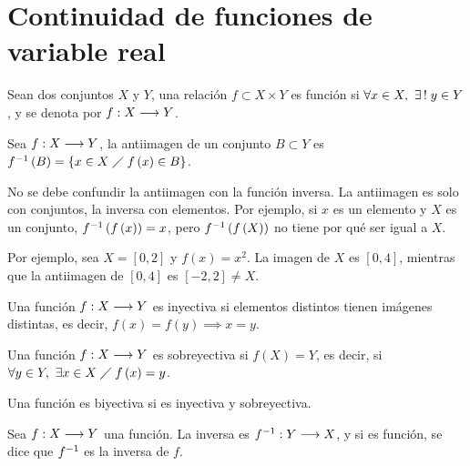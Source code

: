 \chapter{Continuidad de funciones de variable real}

\begin{defi}[Función]
    Sean dos conjuntos $X$ y $Y$, una relación $f\subset X\times Y$ es función si $\forall x\in X,\ \exists\, !\;
    y\in Y$, y se denota por $f : X\longrightarrow Y$.
\end{defi}

\begin{defi}[Antiimagen]
    Sea $f : X\longrightarrow Y$, la antiimagen de un conjunto $B\subset Y$ es $f ^{-1}\left( B \right) = \{
    x\in X\;\diagup\; f\left( x \right) \in B\} $.
\end{defi}

\begin{remark}
    No se debe confundir la antiimagen con la función inversa. La antiimagen es solo con conjuntos, la
    inversa con elementos. Por ejemplo, si $x$ es un elemento y $X$ es un conjunto, $f ^{-1}\left( f\left( 
    x\right)  \right) = x$, pero $f ^{-1}\left( f\left( X \right)  \right)$ no tiene por qué ser igual
    a $X$.

    Por ejemplo, sea $X = [0, 2]$ y $f\left( x \right) = x^2$. La imagen de $X$ es $[0, 4]$, mientras que
    la antiimagen de $[0, 4]$ es $[-2, 2]\neq X$.
\end{remark}

\begin{defi}
    Una función $f : X\longrightarrow Y$ es inyectiva si elementos distintos tienen imágenes distintas, es decir,
    $f\left( x \right) = f\left( y \right) \implies x = y$.
\end{defi}

\begin{defi}
    Una función $f : X\longrightarrow Y$ es sobreyectiva si $f\left( X \right) = Y$, es decir, si $\forall y\in Y,\
    \exists x\in X\;\diagup\; f\left( x \right) = y$.
\end{defi}

\begin{defi}
    Una función es biyectiva si es inyectiva y sobreyectiva.
\end{defi}

\begin{defi}
    Sea $f : X\longrightarrow Y$ una función. La inversa es $f ^{-1} : Y\longrightarrow X$, y si es función, se dice que
    $f ^{-1}$ es la inversa de $f$.
\end{defi}

